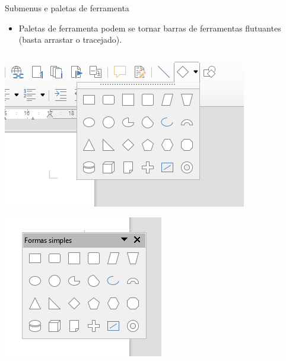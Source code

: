\begin{frame}{Submenus e paletas de ferramenta}
	\begin{block}{}
		\begin{itemize}
			\item Paletas de ferramenta podem se tornar barras de ferramentas flutuantes (basta arrastar o tracejado).
		\end{itemize}
	\end{block}

	\bigskip

	\begin{minipage}{0.49\linewidth}
		\centering
		\includegraphics[width=1\linewidth]{Figuras/Ch04/fig13}
	\end{minipage}\hfill
	\begin{minipage}{0.49\linewidth}
		\centering
		\includegraphics[width=1\linewidth]{Figuras/Ch04/fig14}
	\end{minipage}
\end{frame}


